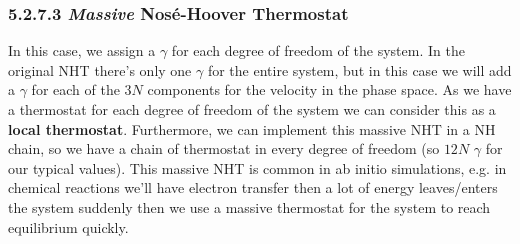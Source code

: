 \subsubsection{5.2.7.3 \textit{Massive} Nosé-Hoover Thermostat}
In this case, we assign a $\gamma$ for each degree of freedom of the system. In the original NHT there's only one $\gamma$ for the entire system, but in this case we will add a $\gamma$ for each of the $3N$ components for the velocity in the phase space. As we have a thermostat for each degree of freedom of the system we can consider this as a \textbf{local thermostat}. Furthermore, we can implement this massive NHT in a NH chain, so we have a chain of thermostat in every degree of freedom (so $12N$ $\gamma$ for our typical values). 
This massive NHT is common in ab initio simulations, e.g. in chemical reactions we'll have electron transfer then a lot of energy leaves/enters the system suddenly then we use a massive thermostat for the system to reach equilibrium quickly. 

